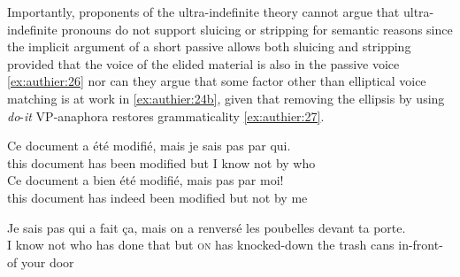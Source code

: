 \documentclass[output=paper,colorlinks,citecolor=brown]{langscibook}
\begin{document}
\begin{exe}
\ex\label{ex:authier:25} 
\begin{xlist} %
\end{xlist}
\end{exe}

Importantly, proponents of the ultra-indefinite theory cannot argue that ultra-indefinite pronouns do not support sluicing or stripping for semantic reasons since the implicit argument of a short passive allows both sluicing and stripping provided that the voice of the elided material is also in the passive voice \ref{ex:authier:26} nor can they argue that some factor other than elliptical voice matching is at work in \ref{ex:authier:24b}, given that removing the ellipsis by using \textit{do}{}-\textit{it} VP-anaphora restores grammaticality \ref{ex:authier:27}.


\begin{exe}
\ex\label{ex:authier:26} 
\begin{xlist} %
        \ex \label{ex:authier:26a}
        \gll  Ce document a été modifié, mais je sais pas par qui.\\
      this document has been modified but I know not by who\\
        \ex \label{ex:authier:26b}
        \gll Ce document a bien été modifié, mais pas par moi!\\
      this document has indeed been modified but not by me\\
\end{xlist}
\end{exe}

\begin{exe}
\ex\label{ex:authier:27} 
        \gll   Je sais pas qui a fait ça, mais on a renversé les poubelles devant ta porte.\\
      I know not who has done that but \textsc{on} has knocked-down the {trash cans} in-front-of your door\\
\end{exe}
\end{document}
